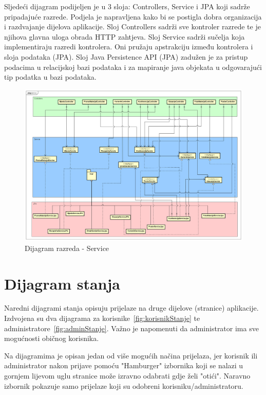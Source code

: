 		\newpage
		Sljedeći dijagram podijeljen je u 3 sloja: Controllers, Service i JPA koji sadrže pripadajuće razrede. Podjela je napravljena kako bi se postigla dobra organizacija i razdvajanje dijelova aplikacije. Sloj Controllers sadrži sve kontroler razrede te je njihova glavna uloga obrada HTTP zahtjeva. Sloj Service sadrži sučelja koja implementiraju razredi kontrolera. Oni pružaju apstrakciju između kontrolera i sloja podataka (JPA). Sloj Java Persistence API (JPA) zadužen je za pristup podacima u relacijskoj bazi podataka i za mapiranje java objekata u odgovarajući tip podatka u bazi podataka.
		\begin{figure}[H]
			\includegraphics[width=\textwidth]{slike/serviceClassDiagram.PNG} %
			\caption{Dijagram razreda - Service}
			\label{fig:dr-service} %
		\end{figure}
			\eject

		\section{Dijagram stanja}

			Naredni dijagrami stanja opisuju prijelaze na druge dijelove (stranice) aplikacije. Izdvojena su dva dijagrama za korisnike~\ref{fig:korisnikStanje} te administratore~\ref{fig:adminStanje}. Važno je napomenuti da administrator ima sve mogućnosti običnog korisnika.
			
			Na dijagramima je opisan jedan od više mogućih načina prijelaza, jer korisnik ili administrator nakon prijave pomoću "Hamburger" izbornika koji se nalazi u gornjem lijevom uglu stranice može izravno odabrati gdje želi "otići". Naravno izbornik pokazuje samo prijelaze koji su odobreni korisniku/administratoru. 
			
